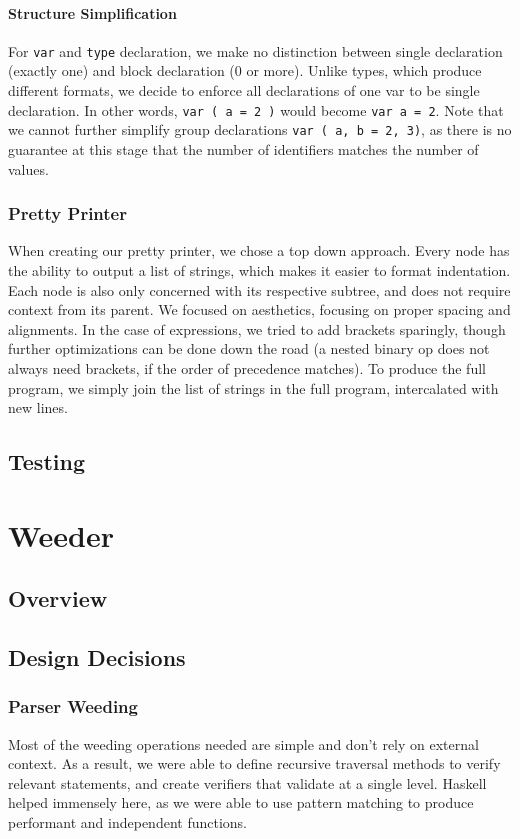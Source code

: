 \documentclass[11pt]{article}
\begin{document}
\paragraph{Structure Simplification}
For \texttt{var} and \texttt{type} declaration, we make no distinction between
single declaration (exactly one) and block declaration (0 or
more). Unlike types, which produce different formats, we decide to
enforce all declarations of one var to be single declaration. In
other words, \texttt{var ( a = 2 )} would become \texttt{var a = 2}. Note that
we cannot further simplify group declarations \texttt{var ( a, b = 2,
	3)}, as there is no guarantee at this stage that the number of
identifiers matches the number of values.
\subsubsection{Pretty Printer}
When creating our pretty printer, we chose a top down approach.
Every node has the ability to output a list of strings, which makes
it easier to format indentation. Each node is also only concerned
with its respective subtree, and does not require context from its
parent. We focused on aesthetics, focusing on proper spacing and
alignments. In the case of expressions, we tried to add brackets
sparingly, though further optimizations can be done down the road
(a nested binary op does not always need brackets, if the order of
precedence matches). To produce the full program, we simply join
the list of strings in the full program, intercalated with new lines.

\subsection{Testing}
\section{Weeder}
\subsection{Overview}
\subsection{Design Decisions}
\subsubsection{Parser Weeding}
Most of the weeding operations needed are simple and don't rely
on external context. As a result, we were able to define recursive
traversal methods to verify relevant statements, and create verifiers
that validate at a single level. Haskell helped immensely here, as
we were able to use pattern matching to produce performant and
independent functions.
\end{document}
